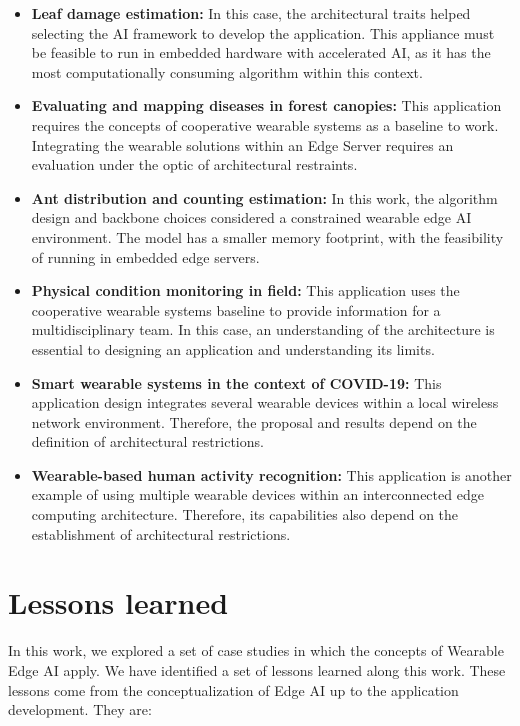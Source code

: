 \begin{itemize}
	\item \textbf{Leaf damage estimation:} In this case, the architectural traits helped selecting the AI framework to develop the application. This appliance must be feasible to run in embedded hardware with accelerated AI, as it has the most computationally consuming algorithm within this context.
	\item \textbf{Evaluating and mapping diseases in forest canopies:} This application requires the concepts of cooperative wearable systems as a baseline to work. Integrating the wearable solutions within an Edge Server requires an evaluation under the optic of architectural restraints.
	\item \textbf{Ant distribution and counting estimation:} In this work, the algorithm design and backbone choices considered a constrained wearable edge AI environment. The model has a smaller memory footprint, with the feasibility of running in embedded edge servers.
	\item \textbf{Physical condition monitoring in field:} This application uses the cooperative wearable systems baseline to provide information for a multidisciplinary team. In this case, an understanding of the architecture is essential to designing an application and understanding its limits.
	\item \textbf{Smart wearable systems in the context of COVID-19:} This application design integrates several wearable devices within a local wireless network environment. Therefore, the proposal and results depend on the definition of architectural restrictions.
	\item \textbf{Wearable-based human activity recognition:} This application is another example of using multiple wearable devices within an interconnected edge computing architecture. Therefore, its capabilities also depend on the establishment of architectural restrictions.
\end{itemize}

\section{Lessons learned}

In this work, we explored a set of case studies in which the concepts of Wearable Edge AI apply. We have identified a set of lessons learned along this work. These lessons come from the conceptualization of Edge AI up to the application development. They are:

